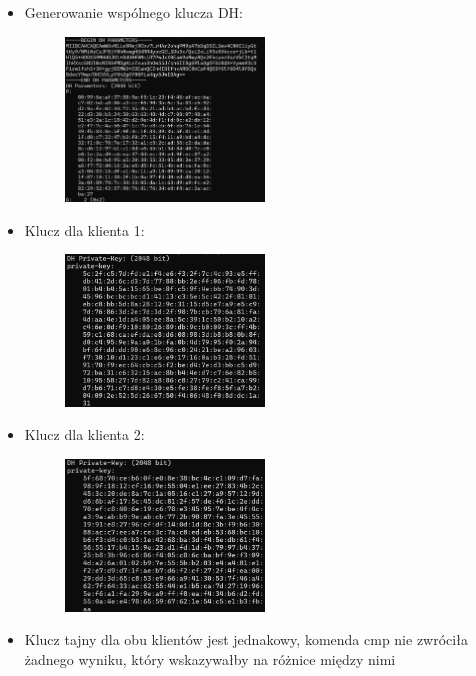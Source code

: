 \documentclass{article}
\begin{document}
\begin{itemize}
  \item Generowanie wspólnego klucza DH:
        \begin{figure}[H]
          \centering
          \includegraphics[width=0.5\textwidth]{klucz_wspolny.png}
        \end{figure}
  \item  Klucz dla klienta 1:
        \begin{figure}[H]
          \centering
          \includegraphics[width=0.5\textwidth]{client1_private_key.png}
        \end{figure}
  \item Klucz dla klienta 2:
        \begin{figure}[H]
          \centering
          \includegraphics[width=0.5\textwidth]{client2_private_key.png}
        \end{figure}
  \item Klucz tajny dla obu klientów jest jednakowy, komenda cmp nie zwróciła żadnego wyniku, który wskazywałby na różnice między nimi

\end{itemize}
\end{document}
